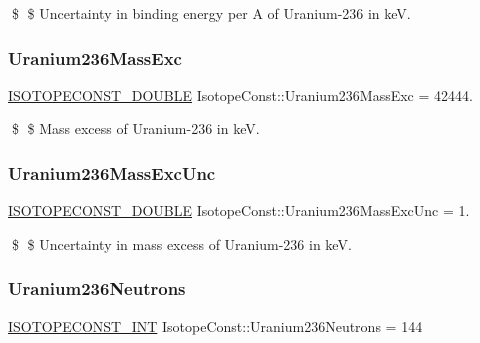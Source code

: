 \$ \$ Uncertainty in binding energy per A of Uranium-\/236 in keV. \mbox{\label{group___isotope_const-_uranium-_u236_ga43498a1437d59bfd0020f2a3fa8275b5}} 
\subsubsection{\texorpdfstring{Uranium236\+Mass\+Exc}{Uranium236MassExc}}
{\footnotesize\ttfamily \mbox{\hyperlink{group___isotope_const-_macros_ga8f45a7272ce02c0b4c65c44636ed719a}{I\+S\+O\+T\+O\+P\+E\+C\+O\+N\+S\+T\+\_\+\+D\+O\+U\+B\+LE}} Isotope\+Const\+::\+Uranium236\+Mass\+Exc = 42444.}

\$ \$ Mass excess of Uranium-\/236 in keV. \mbox{\label{group___isotope_const-_uranium-_u236_ga0e02dcbf6e38c68323494dec33d0ff50}} 
\subsubsection{\texorpdfstring{Uranium236\+Mass\+Exc\+Unc}{Uranium236MassExcUnc}}
{\footnotesize\ttfamily \mbox{\hyperlink{group___isotope_const-_macros_ga8f45a7272ce02c0b4c65c44636ed719a}{I\+S\+O\+T\+O\+P\+E\+C\+O\+N\+S\+T\+\_\+\+D\+O\+U\+B\+LE}} Isotope\+Const\+::\+Uranium236\+Mass\+Exc\+Unc = 1.}

\$ \$ Uncertainty in mass excess of Uranium-\/236 in keV. \mbox{\label{group___isotope_const-_uranium-_u236_ga34f02dee244b9f146d4f7f47e228157f}} 
\subsubsection{\texorpdfstring{Uranium236\+Neutrons}{Uranium236Neutrons}}
{\footnotesize\ttfamily \mbox{\hyperlink{group___isotope_const-_macros_ga5f18360b3e99483a35c32d789e62621c}{I\+S\+O\+T\+O\+P\+E\+C\+O\+N\+S\+T\+\_\+\+I\+NT}} Isotope\+Const\+::\+Uranium236\+Neutrons = 144}

